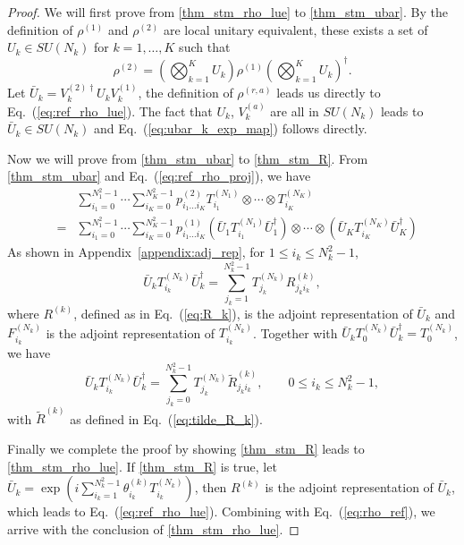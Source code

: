 \documentclass{article}
\begin{document}
\begin{proof}  We will first prove from \ref{thm_stm_rho_lue} to
  \ref{thm_stm_ubar}.  By the definition of $\rho^{(1)}$ and $\rho^{(2)}$
  are local unitary equivalent, these exists a set of
  $U_k\in SU(N_k)$ for $k = 1,\ldots,K$ such that
  \begin{equation}
    \rho^{(2)} = \left(\bigotimes_{k=1}^KU_k\right)
    \rho^{(1)}
    \left(\bigotimes_{k=1}^KU_k\right)^\dagger.
  \end{equation}
  Let $\bar U_k = V^{(2)\dagger}_kU_kV^{(1)}_k$, the definition of $\rho^{(r,a)}$
  leads us directly to Eq.~(\ref{eq:ref_rho_lue}).  The fact that $U_k$,
  $V^{(a)}_k$ are all in $SU(N_k)$ leads to $\bar U_k\in SU(N_k)$ and
  Eq.~(\ref{eq:ubar_k_exp_map}) follows directly.
  
  Now we will prove from \ref{thm_stm_ubar} to \ref{thm_stm_R}.
  From \ref{thm_stm_ubar} and Eq.~(\ref{eq:ref_rho_proj}), we have
  \begin{eqnarray}
    & & \sum_{i_1=0}^{N_1^2-1}\cdots\sum_{i_K=0}^{N_K^2-1}p^{(2)}_{i_1\ldots i_K}
    T^{(N_1)}_{i_1}\otimes\cdots\otimes T^{(N_K)}_{i_K} \nonumber \\ 
    \label{eq:proj_ref}
    & = & \sum_{i_1=0}^{N_1^2-1}\cdots\sum_{i_K=0}^{N_K^2-1}p^{(1)}_{i_1\ldots i_K}
    \left(\bar U_1T^{(N_1)}_{i_1}\bar U_1^\dagger\right)\otimes\cdots\otimes
    \left(\bar U_KT^{(N_K)}_{i_K}\bar U_K^\dagger\right)
  \end{eqnarray}
  As shown in Appendix~\ref{appendix:adj_rep}, for $1 \le i_k \le N_k^2-1$,
  \begin{equation}
    \bar U_kT^{(N_k)}_{i_k}\bar U_k^\dagger =
    \sum_{j_k=1}^{N_k^2-1}T^{(N_k)}_{j_k}R^{(k)}_{j_ki_k},
  \end{equation}
  where $R^{(k)}$, defined as in Eq.~(\ref{eq:R_k}),
  is the adjoint representation of $\bar U_k$ and $F^{(N_k)}_{i_k}$ is the
  adjoint representation of $T^{(N_k)}_{i_k}$.  Together with
  $\bar U_kT^{(N_k)}_0\bar U_k^\dagger = T^{(N_k)}_0$, we have
  \begin{equation}
    \bar U_kT^{(N_k)}_{i_k}\bar U_k^\dagger =
    \sum_{j_k=0}^{N_k^2-1}T^{(N_k)}_{j_k}\tilde R^{(k)}_{j_ki_k},
    \qquad 0 \le i_k \le N_k^2-1,
  \end{equation}
  with $\tilde R^{(k)}$ as defined in Eq.~(\ref{eq:tilde_R_k}).

  Finally we complete the proof by showing \ref{thm_stm_R} leads to
  \ref{thm_stm_rho_lue}.  If \ref{thm_stm_R} is true, let
  $\bar U_k = \exp\left(i\sum_{i_k=1}^{N_k^2-1}\theta^{(k)}_{i_k}T^{(N_k)}_{i_k}\right)$,
  then $R^{(k)}$ is the adjoint representation of $\bar U_k$,
  which leads to Eq.~(\ref{eq:ref_rho_lue}).  Combining with
  Eq.~(\ref{eq:rho_ref}), we arrive with the conclusion of
  \ref{thm_stm_rho_lue}.
\end{proof}
\end{document}
